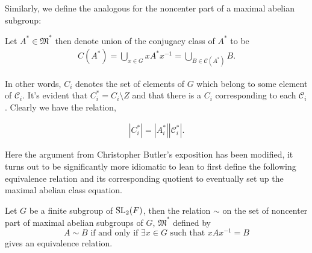 Similarly, we define the analogous for the noncenter part of a maximal abelian subgroup:

\begin{definition}
  \label{noncenter_C}
  \leanok
  Let $A^* \in \mathfrak{M}^*$ then denote union of the conjugacy class of $A^*$ to be
\begin{align*}
  C(A^*) = \bigcup_{x \in G} x A^* x^{-1} = \bigcup_{B \in \mathcal{C}(A^*)} B.
\end{align*}
\end{definition}


In other words, $C_i$ denotes the set of elements of $G$ which belong to some element of $\mathcal{C}_i$. It's evident that $C_i^* = C_i \setminus Z$ and that there is a $C_i$ corresponding to each $\mathcal{C}_i$. Clearly we have the relation,

\begin{lemma}
\label{card_noncenter_C_eq_noncenter_MaximalAbelianSubgroup_mul_noncenter_ConjClassOfSet}
\begin{align} |C_i^*| = |A_i^*||\mathcal{C}_i^*|.
\end{align}
\end{lemma}

Here the argument from Christopher Butler's exposition has been modified, it turns out to be significantly more
idiomatic to lean to first define the following equivalence relation and its corresponding quotient to eventually set up
the maximal abelian class equation.

\begin{lemma}
\label{lift_noncenter_MaximalAbelianSubgroupsOf}
\leanok
 Let $G$ be a finite subgroup of $\operatorname{SL}_2(F)$, then the relation $\sim$ on the set of noncenter part of maximal abelian subgroups of $G$, $\mathfrak{M}^*$ defined by
 \[
 A \sim B \text{ if and only if } \exists x \in G \text{ such that } x A x^{-1} = B
 \]
 gives an equivalence relation.
\end{lemma}

